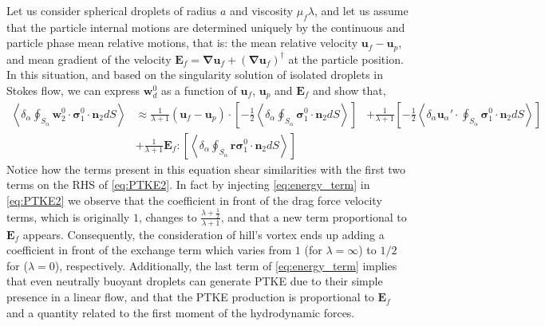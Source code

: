 \documentclass[12pt,a4paper]{article}
\newcommand{\avg}[1]{\left<#1\right>}
\renewcommand{\avg}[1]{\left<#1\right>}
\newcommand{\pavg}[1]{\avg{\delta_\alpha #1}}
\newcommand{\grad}{\mathbf{\nabla}}
\newcommand{\intS}[1]{\oint_{S_\alpha} #1 dS}
\newcommand{\pSavg}[1]{\pavg{\intS{#1}}}
\begin{document}
Let us consider spherical droplets of radius $a$ and viscosity $\mu_f \lambda$, and let us assume that the particle internal motions are determined uniquely by the continuous and particle phase mean relative motions, that is: the mean relative velocity $\textbf{u}_f - \textbf{u}_p$, and mean gradient of the velocity $\textbf{E}_f = \grad \textbf{u}_f+ (\grad \textbf{u}_f)^\dagger$ at the particle position. 
In this situation, and based on the singularity solution of isolated droplets in Stokes flow, we can express $\textbf{w}_d^0$ as a function of $\textbf{u}_f$, $\textbf{u}_p$ and $\textbf{E}_f$ and show that, 
\begin{align}
    \pSavg{\textbf{w}_2^0 \cdot \bm{\sigma}_1^0\cdot\textbf{n}_2}
    &\approx
    \frac{1}{\lambda+1}(\textbf{u}_{f} - \textbf{u}_p) \cdot \left[
        -\frac{1}{2}\pSavg{ \bm{\sigma}_1^0\cdot\textbf{n}_2}
    \right]\nonumber
    &+ \frac{1}{\lambda+1} \left[
        -\frac{1}{2}
        \pavg{\textbf{u}_\alpha' \cdot  \intS{\bm{\sigma}_1^0\cdot\textbf{n}_2}}
    \right] \nonumber
    \\
    &+ \frac{1}{\lambda + 1} \textbf{E}_{f} : \left[ 
     \pSavg{\textbf{r} \bm{\sigma}_1^0\cdot\textbf{n}_2}
    \right]
    \label{eq:energy_term}
\end{align} 
Notice how the terms present in this equation shear similarities with the first two terms on the RHS of \eqref{eq:PTKE2}. 
In fact by injecting \eqref{eq:energy_term} in \eqref{eq:PTKE2} we observe that the coefficient in front of the drag force velocity terms, which is originally $1$, changes to $\frac{\lambda +\frac{1}{2}}{\lambda+1}$, and that a new term proportional to $\textbf{E}_f$ appears. 
Consequently, the consideration of hill's vortex ends up adding a coefficient in front of the exchange term which varies from $1$ (for $\lambda = \infty$) to $1/2$ for ($\lambda = 0$), respectively.  
Additionally, the last term of \eqref{eq:energy_term} implies that even neutrally buoyant droplets can generate PTKE due to their simple presence in a linear flow, and that the PTKE production is proportional to $\textbf{E}_f$ and a quantity related to the first moment of the hydrodynamic forces.  
\end{document}
